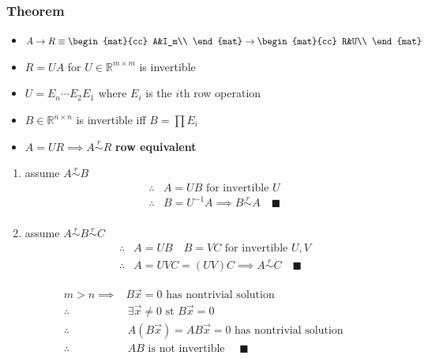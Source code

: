 		\subsubsection{Theorem}
			\begin{theorem}
				\begin{itemize}
					\item $A\to R\equiv\begin{mat}{cc} A&I_m\\ \end{mat}\to\begin{mat}{cc} R&U\\ \end{mat}$
					\item $R=UA$ for $U\in\mathbb{R}^{m\times m}$ is invertible
					\item $U=E_n\cdots E_2E_1$ where $E_i$ is the $i$th row operation
					\item $B\in\mathbb{R}^{n\times n}$ is invertible iff $B=\prod E_i$
					\item $A=UR\implies A\overset r\sim R$ \textbf{row equivalent}
				\end{itemize}
			\end{theorem} 
			\begin{example}
				\begin{enumerate}
					\item assume $A\overset r\sim B$
						\begin{align*}
							\therefore&A=UB\text{ for invertible }U\\
							\therefore&B=U^{-1}A\implies B\overset r\sim A\quad\blacksquare\\
						\end{align*}
					\item assume $A\overset r\sim B\overset r\sim C$
						\begin{align*}
							\therefore&A=UB\quad B=VC\text{ for invertible }U,V\\
							\therefore&A=UVC=(UV)C\implies A\overset r\sim C\quad\blacksquare
						\end{align*}
				\end{enumerate}
			\end{example}
			\begin{example}
				\begin{align*}
					m>n\implies&B\vec x=0\text{ has nontrivial solution }\\
					\therefore&\,\exists\vec x\ne0\text{ st }B\vec x=0\\
					\therefore&\,A(B\vec x)=AB\vec x=0\text{ has nontrivial solution }\\
					\therefore&\,AB\text{ is not invertible }\quad\blacksquare
				\end{align*}
			\end{example}
